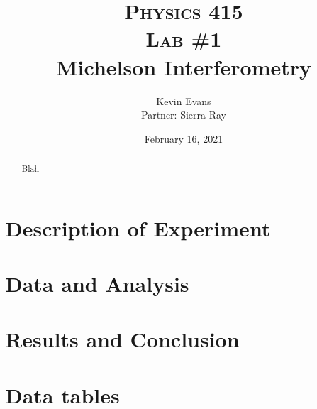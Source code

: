\documentclass[notitlepage]{report}
\title{
	\textsc{ \small
		Physics 415
	} \\
	{\textsc{\small Lab \#1}} \\
	Michelson Interferometry
}
\author{Kevin Evans \\ Partner: Sierra Ray}
\date{February 16, 2021}
\begin{document}
	\begin{titlingpage}
		\maketitle
		\begin{abstract}
			\noindent Blah
		\end{abstract}
	\end{titlingpage}

	\section{Description of Experiment}
	
	\section{Data and Analysis}
	
	\section{Results and Conclusion}
	
	\section*{Data tables}
\end{document}
